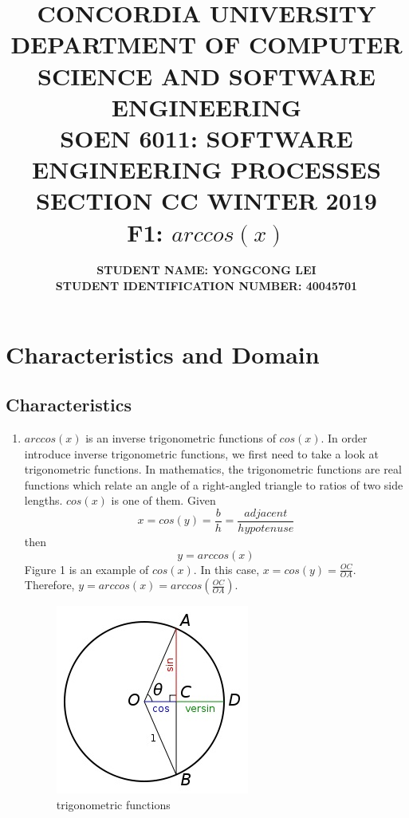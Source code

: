 \documentclass[10pt]{article}
\title{{\large \textbf{CONCORDIA UNIVERSITY \\ DEPARTMENT OF COMPUTER SCIENCE AND SOFTWARE ENGINEERING \\ SOEN 6011: SOFTWARE ENGINEERING PROCESSES \\ SECTION CC WINTER 2019 \\ F1: $arccos(x)$}  \\ }}
\author{\normalsize \textbf {STUDENT NAME: YONGCONG LEI} \\ \normalsize \textbf{STUDENT IDENTIFICATION NUMBER: 40045701 }}
\date{}
\begin{document}
\maketitle

\section{Characteristics and Domain}
\subsection{Characteristics}

\begin{enumerate}
    \item $arccos(x)$ is an inverse trigonometric functions of $cos(x)$. In order introduce inverse trigonometric functions, we first need to take a look at trigonometric functions. In mathematics, the trigonometric functions are real functions which relate an angle of a right-angled triangle to ratios of two side lengths\cite{einstein}. $cos(x)$ is one of them. Given $$x = cos(y) = \frac{b}{h} = \frac{adjacent}{hypotenuse}$$ then $$y = arccos(x)$$ Figure 1 is an example of $cos(x)$. In this case, $x = cos(y) = \frac{OC}{OA}$. Therefore, $y = arccos(x) = arccos(\frac{OC}{OA})$.
    \begin{center}
      \begin{figure}[h!]
          \centering
          \includegraphics[width=0.3\linewidth]{image/cos_detail.jpg}
          \caption{trigonometric functions}
          \label{fig:my_label}
      \end{figure}
    \end{center}
    
\end{enumerate}
\end{document}

